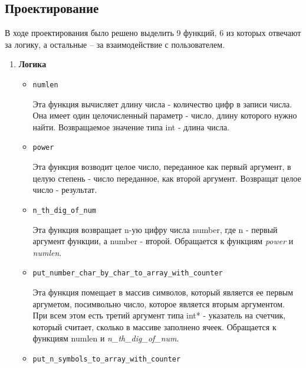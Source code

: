 \documentclass[12pt,a4paper]{report}
\begin{document}
\subsection{Проектирование}
\hspace{\parindent}
В ходе проектирования было решено выделить 9 функций, 6 из которых отвечают за логику, а остальные -- за взаимодействие с пользователем.
\begin{enumerate}
\item \textbf{Логика}
\begin{itemize}
\item \verb-numlen-

Эта функция вычисляет длину числа - количество цифр в записи числа. Она имеет один целочисленный параметр - число, длину которого нужно найти. Возвращаемое значение типа int - длина числа.
\end{itemize}

\begin{itemize}
\item \verb-power-

Эта функция возводит целое число, переданное как первый аргумент, в целую степень - число переданное, как второй аргумент. Возвращат целое число - результат.
\end{itemize}

\begin{itemize}
\item \verb-n_th_dig_of_num-

Эта функция возвращает n-ую цифру числа number, где n - первый аргумент функции, а number - второй. Обращается к функциям \textit{power} и \textit{numlen}.
\end{itemize}

\begin{itemize}
\item \verb-put_number_char_by_char_to_array_with_counter-

Эта функция помещает в массив символов, который является ее первым аргуметом, посимвольно число, которое является вторым аргументом. При всем этом есть третий аргумент типа int* - указатель на счетчик, который считает, сколько в массиве заполнено ячеек. Обращается к функциям numlen и \textit{n\_th\_dig\_of\_num}.
\end{itemize}

\begin{itemize}
\item \verb-put_n_symbols_to_array_with_counter-


\end{itemize}
\end{enumerate}
\end{document}
